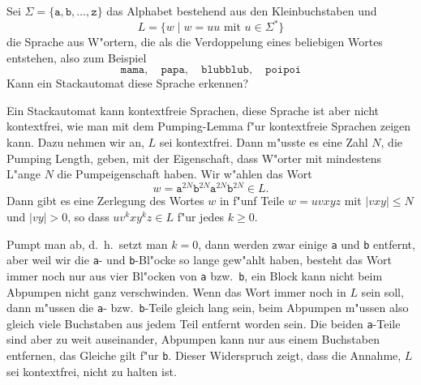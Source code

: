 Sei $\Sigma=\{\texttt{a},\texttt{b},\dots,\texttt{z}\}$ das Alphabet
bestehend aus den Kleinbuchstaben und 
\[
L=\{ w\;|\; \text{$w=uu$ mit $u\in\Sigma^*$}\}
\]
die Sprache aus W"ortern, die als die Verdoppelung eines beliebigen
Wortes entstehen, also zum Beispiel
\[
\texttt{mama},\quad
\texttt{papa},\quad
\texttt{blubblub},\quad
\texttt{poipoi}
\]
Kann ein Stackautomat diese Sprache erkennen?





\begin{loesung}
Ein Stackautomat kann kontextfreie Sprachen, diese Sprache ist aber nicht
kontextfrei, wie man mit dem Pumping-Lemma f"ur kontextfreie
Sprachen zeigen kann.
Dazu nehmen wir an, $L$ sei kontextfrei.
Dann m"usste es eine Zahl $N$, die Pumping Length, geben, mit der Eigenschaft,
dass W"orter mit mindestens L"ange $N$ die Pumpeigenschaft haben.
Wir w"ahlen das Wort
\[
w=
\texttt{a}^{2N}
\texttt{b}^{2N}
\texttt{a}^{2N}
\texttt{b}^{2N}
\in L.
\]
Dann gibt es eine Zerlegung des Wortes $w$ in f"unf Teile $w=uvxyz$ mit
$|vxy|\le N$ und $|vy|>0$, so dass $uv^kxy^kz\in L$ f"ur jedes $k\ge 0$.

Pumpt man ab, d.~h.~setzt man $k=0$, dann werden zwar einige \texttt{a}
und \texttt{b} entfernt, aber weil wir die \texttt{a}- und \texttt{b}-Bl"ocke
so lange gew"ahlt haben, besteht das Wort immer noch nur aus
vier Bl"ocken von \texttt{a} bzw.~\texttt{b}, ein Block kann nicht beim
Abpumpen nicht ganz verschwinden.
Wenn das Wort immer noch in $L$ sein soll, dann m"ussen die \texttt{a}-
bzw.~\texttt{b}-Teile gleich lang sein, beim Abpumpen m"ussen also
gleich viele Buchstaben aus jedem Teil entfernt worden sein.
Die beiden \texttt{a}-Teile sind aber zu weit auseinander, Abpumpen
kann nur aus einem Buchstaben entfernen, das Gleiche gilt f"ur \texttt{b}.
Dieser Widerspruch zeigt, dass die Annahme, $L$ sei kontextfrei, nicht
zu halten ist.
\end{loesung}





